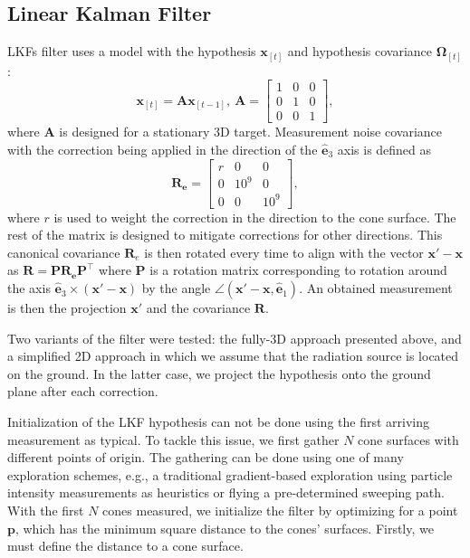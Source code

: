 \documentclass[a4paper,11pt,titlepage,twoside]{book}
\newcommand{\m}[1]{\ensuremath{\mathbf{#1}}}
\begin{document}

\subsection{Linear Kalman Filter}

\acp{LKF} filter uses a model with the hypothesis $\mathbf{x}_{[t]}$ and hypothesis covariance $\mathbf{\Omega}_{[t]}$:
\begin{equation}
  \mathbf{x}_{[t]} = \m{A}\mathbf{x}_{[t-1]},~\mathbf{A} = \left[\begin{smallmatrix}
    1 & 0 & 0\\
    0 & 1 & 0\\
    0 & 0 & 1
  \end{smallmatrix}\right],
  \label{eq:lti_model}
\end{equation}
where $\mathbf{A}$ is designed for a stationary 3D target.
Measurement noise covariance with the correction being applied in the direction of the $\mathbf{\hat{e}}_3$ axis is defined as
\begin{equation}
  \mathbf{R_e} = \left[\begin{smallmatrix}
    r & 0 & 0 \\
    0 & 10^9 & 0 \\
    0 & 0 & 10^9
  \end{smallmatrix}\right],
\end{equation}
where $r$ is used to weight the correction in the direction to the cone surface.
The rest of the matrix is designed to mitigate corrections for other directions.
This canonical covariance $\mathbf{R}_e$ is then rotated every time to align with the vector $\mathbf{x}' - \mathbf{x}$ as $\mathbf{R} = \mathbf{P}\mathbf{R_e}\mathbf{P}^{\intercal}$
where $\mathbf{P}$ is a rotation matrix corresponding to rotation around the axis $\mathbf{\hat{e}}_3 \times \left(\mathbf{x}' - \mathbf{x}\right)$ by the angle $\angle \left(\mathbf{x}' - \mathbf{x}, \mathbf{\hat{e}}_1\right)$.
An obtained measurement is then the projection $\mathbf{x}'$ and the covariance $\mathbf{R}$.

Two variants of the filter were tested:
the fully-3D approach presented above, and a simplified 2D approach in which we assume that the radiation source is located on the ground.
In the latter case, we project the hypothesis onto the ground plane after each correction.

Initialization of the \ac{LKF} hypothesis can not be done using the first arriving measurement as typical.
To tackle this issue, we first gather $N$ cone surfaces with different points of origin.
The gathering can be done using one of many exploration schemes, e.g., a traditional gradient-based exploration using particle intensity measurements as heuristics or flying a pre-determined sweeping path.
With the first $N$ cones measured, we initialize the filter by optimizing for a point $\mathbf{p}$, which has the minimum square distance to the cones' surfaces.
Firstly, we must define the distance to a cone surface.
\end{document}
